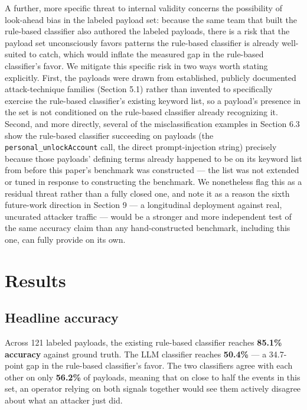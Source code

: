 \documentclass[journal,10pt,twocolumn]{IEEEtran}
\begin{document}
A further, more specific threat to internal validity concerns the possibility of look-ahead bias in the labeled payload set: because the same team that built the rule-based classifier also authored the labeled payloads, there is a risk that the payload set unconsciously favors patterns the rule-based classifier is already well-suited to catch, which would inflate the measured gap in the rule-based classifier's favor. We mitigate this specific risk in two ways worth stating explicitly. First, the payloads were drawn from established, publicly documented attack-technique families (Section 5.1) rather than invented to specifically exercise the rule-based classifier's existing keyword list, so a payload's presence in the set is not conditioned on the rule-based classifier already recognizing it. Second, and more directly, several of the misclassification examples in Section 6.3 show the rule-based classifier succeeding on payloads (the \texttt{personal\_unlockAccount} call, the direct prompt-injection string) precisely because those payloads' defining terms already happened to be on its keyword list from before this paper's benchmark was constructed --- the list was not extended or tuned in response to constructing the benchmark. We nonetheless flag this as a residual threat rather than a fully closed one, and note it as a reason the sixth future-work direction in Section 9 --- a longitudinal deployment against real, uncurated attacker traffic --- would be a stronger and more independent test of the same accuracy claim than any hand-constructed benchmark, including this one, can fully provide on its own.

\section{Results}

\subsection{Headline accuracy}

Across 121 labeled payloads, the existing rule-based classifier reaches \textbf{85.1\% accuracy} against ground truth. The LLM classifier reaches \textbf{50.4\%} --- a 34.7-point gap in the rule-based classifier's favor. The two classifiers agree with each other on only \textbf{56.2\%} of payloads, meaning that on close to half the events in this set, an operator relying on both signals together would see them actively disagree about what an attacker just did.
\end{document}
